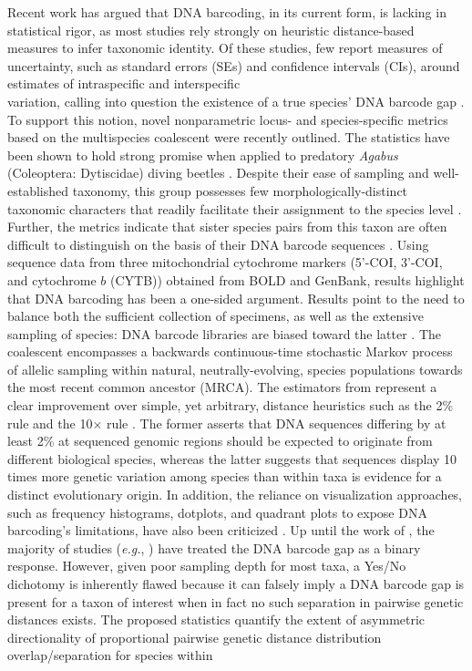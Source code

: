 \documentclass[12pt]{article}
\begin{document}
Recent work has argued that DNA barcoding, in its current form, is lacking in statistical rigor, as most studies rely strongly on heuristic distance-based measures to infer taxonomic identity. Of these studies, few report measures of uncertainty, such as standard errors (SEs) and confidence intervals (CIs), around estimates of intraspecific and interspecific \\ variation, calling into question the existence of a true species' DNA barcode gap \citep{candek2015dna, phillips2022lack}. To support this notion, novel nonparametric locus- and species-specific metrics based on the multispecies coalescent \citep{rannala2003bayes, yang2017bayesian} were recently outlined. The statistics have been shown to hold strong promise when applied to predatory \textit{Agabus} (Coleoptera: Dytiscidae) diving beetles \citep{phillips2024measure}. Despite their ease of sampling and well-established taxonomy, this group possesses few morphologically-distinct taxonomic characters that readily facilitate their assignment to the species level \citep{bergsten2012effect}. Further, the metrics indicate that sister species pairs from this taxon are often difficult to distinguish on the basis of their DNA barcode sequences \citep{phillips2024measure}. Using sequence data from three mitochondrial cytochrome markers (5'-COI, 3'-COI, and cytochrome $b$ (CYTB)) obtained from BOLD and GenBank, results highlight that DNA barcoding has been a one-sided argument. Results point to the need to balance both the sufficient collection of specimens, as well as the extensive sampling of species: DNA barcode libraries are biased toward the latter \citep{phillips2024measure}. The coalescent \citep{kingman1982coalescent, kingman1982genealogy} encompasses a backwards continuous-time stochastic Markov process of allelic sampling within natural, neutrally-evolving, species populations towards the most recent common ancestor (MRCA). The estimators from \citet{phillips2024measure} represent a clear improvement over simple, yet arbitrary, distance heuristics such as the 2\% rule \citep{hebert2003biological} and the 10$\times$ rule \citep{hebert2004identification}. The former asserts that DNA sequences differing by at least 2\% at sequenced genomic regions should be expected to originate from different biological species, whereas the latter suggests that sequences display 10 times more genetic variation among species than within taxa is evidence for a distinct evolutionary origin. In addition, the reliance on visualization approaches, such as frequency histograms, dotplots, and quadrant plots to expose DNA barcoding's limitations, have also been criticized \citep{collins2013seven, phillips2022lack}. Up until the work of \cite{phillips2024measure}, the majority of studies (\textit{e.g.}, \citet{young2021macer}) have treated the DNA barcode gap as a binary response. However, given poor sampling depth for most taxa, a Yes/No dichotomy is inherently flawed because it can falsely imply a DNA barcode gap is present for a taxon of interest when in fact no such separation in pairwise genetic distances exists. The proposed statistics quantify the extent of asymmetric directionality of proportional pairwise genetic distance distribution overlap/separation for species within 
\end{document}
